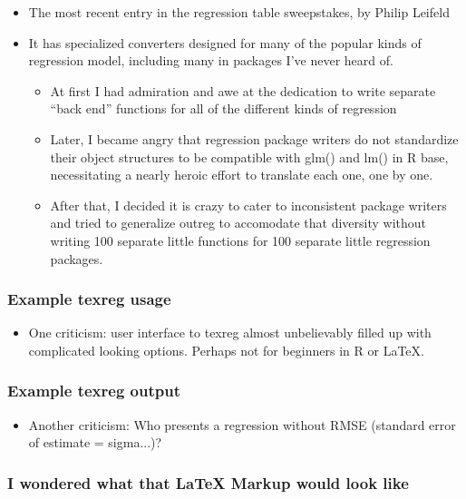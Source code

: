 \documentclass[11pt,english]{beamer}
\def\lyxframeend{} %
\def\Sweavesize{\normalsize}
\begin{document}
\lyxframeend{}
\begin{itemize}
\item The most recent entry in the regression table sweepstakes, by Philip
Leifeld
\item It has specialized converters designed for many of the popular kinds
of regression model, including many in packages I've never heard of.

\begin{itemize}
\item At first I had admiration and awe at the dedication to write separate
``back end'' functions for all of the different kinds of regression
\item Later, I became angry that regression package writers do not standardize
their object structures to be compatible with glm() and lm() in R
base, necessitating a nearly heroic effort to translate each one,
one by one.
\item After that, I decided it is crazy to cater to inconsistent package
writers and tried to generalize outreg to accomodate that diversity
without writing 100 separate little functions for 100 separate little
regression packages.
\end{itemize}
\end{itemize}

\lyxframeend{}

\begin{frame}[containsverbatim]
\frametitle{Example texreg usage}


\begin{itemize}
\item One criticism: user interface to texreg almost unbelievably filled
up with complicated looking options. Perhaps not for beginners in
R or \LaTeX{}.
\end{itemize}
\end{frame}

\begin{frame}[containsverbatim]
\frametitle{Example texreg output}


\begin{itemize}
\item Another criticism: Who presents a regression without RMSE (standard
error of estimate = sigma...)?
\end{itemize}
\end{frame}

\begin{frame}[containsverbatim]
\frametitle{I wondered what that LaTeX Markup would look like}

\def\Sweavesize{\scriptsize}



\end{frame}
\end{document}
